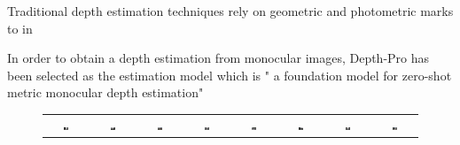 Traditional depth estimation techniques rely on geometric and photometric marks to in


In order to obtain a depth estimation from monocular images, Depth-Pro \cite{depth-pro} has been selected as the estimation model which is " a foundation model for zero-shot metric monocular depth estimation"



\begin{figure}[h]
    \centering
    \setlength{\tabcolsep}{1pt}  %
    \renewcommand{\arraystretch}{0.5}
    \begin{tabular}{c c c c c c c c}
        \includegraphics[width=0.12\textwidth]{images/metodology/depth_images/original_image_0.png} & 
        \includegraphics[width=0.12\textwidth]{images/metodology/depth_images/original_image_1.png} & 
        \includegraphics[width=0.12\textwidth]{images/metodology/depth_images/original_image_2.png} &
        \includegraphics[width=0.12\textwidth]{images/metodology/depth_images/original_image_3.png} &
        \includegraphics[width=0.12\textwidth]{images/metodology/depth_images/original_image_4.png} &   
        \includegraphics[width=0.12\textwidth]{images/metodology/depth_images/original_image_5.png} & 
        \includegraphics[width=0.12\textwidth]{images/metodology/depth_images/original_image_6.png} &
        \includegraphics[width=0.12\textwidth]{images/metodology/depth_images/original_image_7.png} \\


\end{tabular}
\end{figure}
